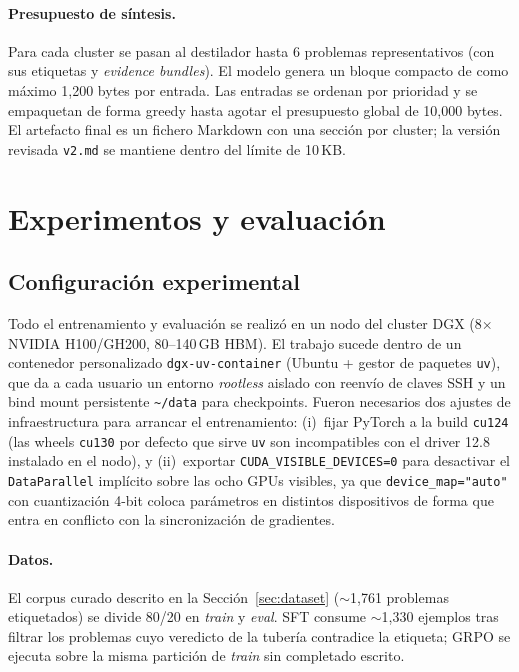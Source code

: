 \documentclass{article}
\begin{document}
\paragraph{Presupuesto de s\'intesis.} Para cada cluster se pasan al destilador hasta 6 problemas representativos (con sus etiquetas y \textit{evidence bundles}). El modelo genera un bloque compacto de como m\'aximo 1{,}200 bytes por entrada. Las entradas se ordenan por prioridad y se empaquetan de forma greedy hasta agotar el presupuesto global de 10{,}000 bytes. El artefacto final es un fichero Markdown con una secci\'on por cluster; la versi\'on revisada \texttt{v2.md} se mantiene dentro del l\'imite de 10\,KB.

\section{Experimentos y evaluaci\'on}
\label{sec:experiments}

\subsection{Configuraci\'on experimental}

Todo el entrenamiento y evaluaci\'on se realiz\'o en un nodo del cluster DGX (8$\times$ NVIDIA H100/GH200, 80--140\,GB HBM). El trabajo sucede dentro de un contenedor personalizado \texttt{dgx-uv-container} (Ubuntu + gestor de paquetes \texttt{uv}), que da a cada usuario un entorno \textit{rootless} aislado con reenv\'io de claves SSH y un bind mount persistente \texttt{\~{}/data} para checkpoints. Fueron necesarios dos ajustes de infraestructura para arrancar el entrenamiento: (i)~fijar PyTorch a la build \texttt{cu124} (las wheels \texttt{cu130} por defecto que sirve \texttt{uv} son incompatibles con el driver 12.8 instalado en el nodo), y (ii)~exportar \texttt{CUDA\_VISIBLE\_DEVICES=0} para desactivar el \texttt{DataParallel} impl\'icito sobre las ocho GPUs visibles, ya que \texttt{device\_map="auto"} con cuantizaci\'on 4-bit coloca par\'ametros en distintos dispositivos de forma que entra en conflicto con la sincronizaci\'on de gradientes.

\paragraph{Datos.} El corpus curado descrito en la Secci\'on~\ref{sec:dataset} ($\sim$1{,}761 problemas etiquetados) se divide 80/20 en \textit{train} y \textit{eval}. SFT consume $\sim$1{,}330 ejemplos tras filtrar los problemas cuyo veredicto de la tuber\'ia contradice la etiqueta; GRPO se ejecuta sobre la misma partici\'on de \textit{train} sin completado escrito.
\end{document}

